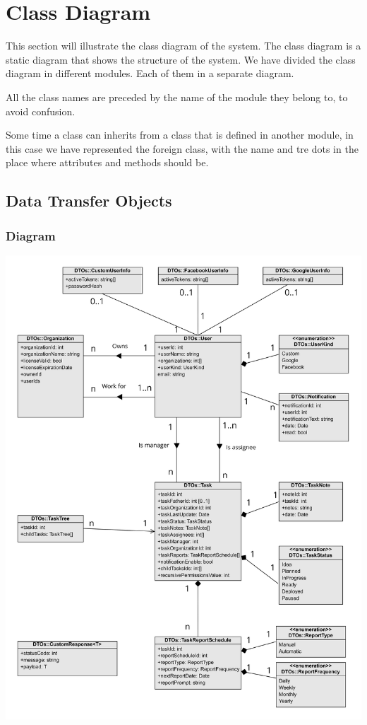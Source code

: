 \documentclass{article}
\begin{document}
\section{Class Diagram}

This section will illustrate the class diagram of the system. The class diagram is a static diagram that shows the structure of the system.
We have divided the class diagram in different modules. Each of them in a separate diagram.

All the class names are preceded by the name of the module they belong to, to avoid confusion.

Some time a class can inherits from a class that is defined in another module, in this case
we have represented the foreign class, with the name and tre dots in the place where attributes and methods should be.

\subsection{Data Transfer Objects}

\subsubsection{Diagram}

\includegraphics[width=\textwidth,height=\textheight,keepaspectratio]{images/class_diagram/data_transfert_objects.jpg}
\end{document}
